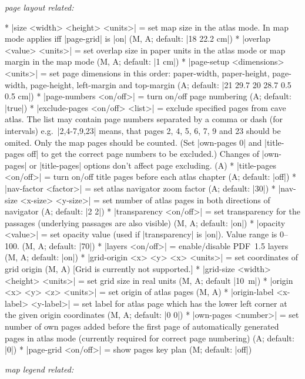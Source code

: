   {\it page layout related:}

  * |size <width> <height> <units>| = set map size in the atlas mode.
    In map mode applies iff |page-grid| is |on| (M, A; default: |18 22.2 cm|)
  * |overlap <value> <units>| = set overlap size in paper units in the atlas 
    mode or map margin in the map mode (M, A; default: |1 cm|)
  * |page-setup <dimensions> <units>| = set page dimensions in
    this order: paper-width, paper-height, page-width, page-height,
    left-margin and top-margin (A; default: |21 29.7 20 28.7 0.5 0.5 cm|)
  * |page-numbers <on/off>| = turn on/off page numbering (A; default: |true|)
  * |exclude-pages <on/off> <list>| = exclude specified pages from cave
    atlas. The list may contain page numbers separated by a comma or dash 
    (for intervals) e.g.~|2,4-7,9,23| means, that pages 2, 4, 5, 6, 7, 9 and 23 
    should be omited. Only the map pages should be counted. (Set |own-pages 0| 
    and |title-pages off| to get the correct page numbers to be excluded.) 
    Changes of |own-pages| or |title-pages| options don't affect page 
    excluding. (A)
  * |title-pages <on/off>| = turn on/off title pages before each atlas chapter
    (A; default: |off|)
  * |nav-factor <factor>| = set atlas navigator zoom factor (A; default: |30|)
  * |nav-size <x-size> <y-size>| = set number of atlas pages in 
    both directions of navigator (A; default: |2 2|)
  * |transparency <on/off>| = set transparency for the passages (underlying 
    passages are also visible) (M, A; default: |on|)
  * |opacity <value>| = set opacity value (used if |transparency| is |on|). 
    Value range is 0--100. (M, A; default: |70|)
  * |layers <on/off>| = enable/disable PDF~1.5 layers (M, A; default: |on|)
  * |grid-origin <x> <y> <x> <units>| = set coordinates of grid
    origin (M, A) [Grid is currently not supported.]
  * |grid-size <width> <height> <units>| = set grid size in real
    units (M, A; default \hbox{|10 m|})
  * |origin <x> <y> <z> <units>| = set origin of atlas pages (M, A)
  * |origin-label <x-label> <y-label>| = set label for atlas page
    which has the lower left corner at the given origin coordinates
    (M, A; default: |0 0|)
  * |own-pages <number>| = set number of own pages added before 
    the first page of automatically generated pages in atlas mode
    (currently required for correct page numbering) (A; default: |0|)
  * |page-grid <on/off>| = show pages key plan (M; default: |off|)

  {\it map legend related:}

